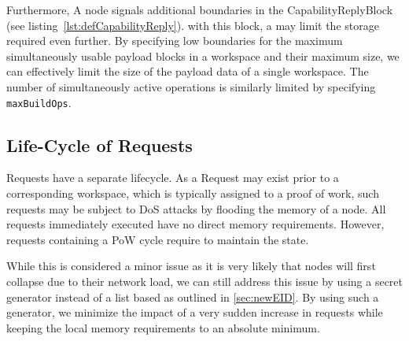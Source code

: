 Furthermore, A node signals additional boundaries in the CapabilityReplyBlock (see listing~\ref{lst:defCapabilityReply}). with this block, a \VortexNode{} may limit the storage required even further. By specifying low boundaries for the maximum simultaneously usable payload blocks in a workspace and their maximum size, we can effectively limit the size of the payload data of a single workspace. The number of simultaneously active operations is similarly limited by specifying \texttt{maxBuildOps}.

\subsection{Life-Cycle of Requests}
Requests have a separate lifecycle. As a Request may exist prior to a corresponding workspace, which is typically assigned to a proof of work, such requests may be subject to DoS attacks by flooding the memory of a node. All requests immediately executed have no direct memory requirements. However, requests containing a PoW cycle require to maintain the state. 

While this is considered a minor issue as it is very likely that nodes will first collapse due to their network load, we can still address this issue by using a secret generator instead of a list based as outlined in \cref{sec:newEID}. By using such a generator, we minimize the impact of a very sudden increase in requests while keeping the local memory requirements to an absolute minimum. 



